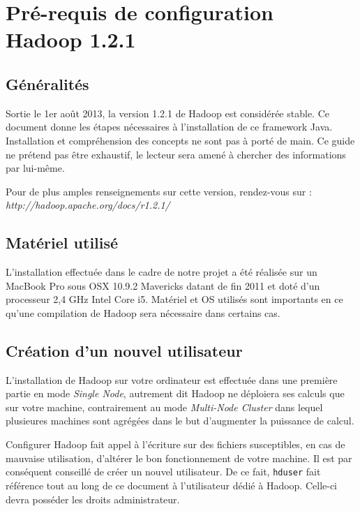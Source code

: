 \section{Pré-requis de configuration Hadoop 1.2.1}

\subsection{Généralités}

\par Sortie le 1er août 2013, la version 1.2.1 de Hadoop est considérée stable. Ce document donne les étapes nécessaires à l'installation de ce framework Java. Installation et compréhension des concepts ne sont pas à porté de main. Ce guide ne prétend pas être exhaustif, le lecteur sera amené à chercher des informations par lui-même.

\par Pour de plus amples renseignements sur cette version, rendez-vous sur :\\
\emph{http://hadoop.apache.org/docs/r1.2.1/}

\subsection{Matériel utilisé}

\par L'installation effectuée dans le cadre de notre projet a été réalisée sur un MacBook Pro sous OSX 10.9.2 Mavericks datant de fin 2011 et doté d'un processeur 2,4 GHz Intel Core i5. Matériel et OS utilisés sont importants en ce qu'une compilation de Hadoop sera nécessaire dans certains cas.

\subsection{Création d'un nouvel utilisateur}

\par L'installation de Hadoop sur votre ordinateur est effectuée dans une première partie en mode \emph{Single Node}, autrement dit Hadoop ne déploiera ses calculs que sur votre machine, contrairement au mode \emph{Multi-Node Cluster} dans lequel plusieures machines sont agrégées dans le but d'augmenter la puissance de calcul.

\par Configurer Hadoop fait appel à l'écriture sur des fichiers susceptibles, en cas de mauvaise utilisation, d'altérer le bon fonctionnement de votre machine. Il est par conséquent conseillé de créer un nouvel utilisateur. De ce fait, \texttt{hduser} fait référence tout au long de ce document à l'utilisateur dédié à Hadoop. Celle-ci devra posséder les droits administrateur.

